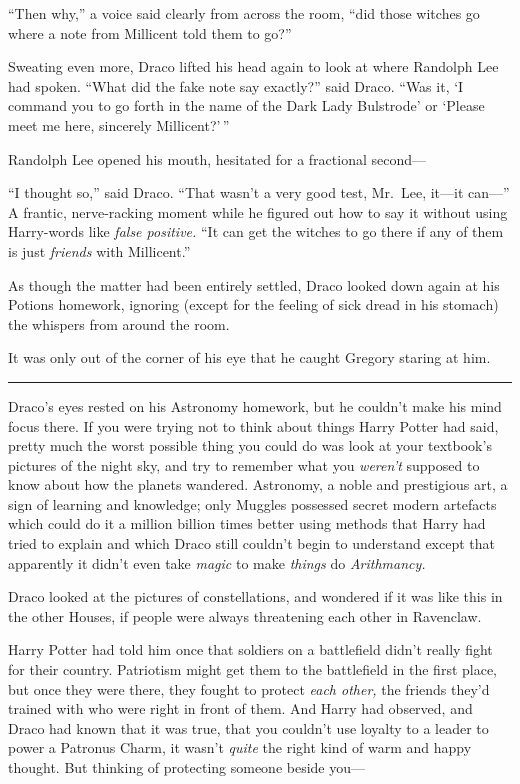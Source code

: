 ``Then why,'' a voice said clearly from across the room, ``did those
witches go where a note from Millicent told them to go?''

Sweating even more, Draco lifted his head again to look at where
Randolph Lee had spoken. ``What did the fake note say exactly?'' said
Draco. ``Was it, `I command you to go forth in the name of the Dark Lady
Bulstrode' or `Please meet me here, sincerely Millicent?'\,''

Randolph Lee opened his mouth, hesitated for a fractional second---

``I thought so,'' said Draco. ``That wasn't a very good test, Mr.~Lee,
it---it can---'' A frantic, nerve-racking moment while he figured out
how to say it without using Harry-words like \emph{false positive.} ``It
can get the witches to go there if any of them is just \emph{friends}
with Millicent.''

As though the matter had been entirely settled, Draco looked down again
at his Potions homework, ignoring (except for the feeling of sick dread
in his stomach) the whispers from around the room.

It was only out of the corner of his eye that he caught Gregory staring
at him.

\begin{center}\rule{3in}{0.4pt}\end{center}

Draco's eyes rested on his Astronomy homework, but he couldn't make his
mind focus there. If you were trying not to think about things Harry
Potter had said, pretty much the worst possible thing you could do was
look at your textbook's pictures of the night sky, and try to remember
what you \emph{weren't} supposed to know about how the planets wandered.
Astronomy, a noble and prestigious art, a sign of learning and
knowledge; only Muggles possessed secret modern artefacts which could do
it a million billion times better using methods that Harry had tried to
explain and which Draco still couldn't begin to understand except that
apparently it didn't even take \emph{magic} to make \emph{things} do
\emph{Arithmancy.}

Draco looked at the pictures of constellations, and wondered if it was
like this in the other Houses, if people were always threatening each
other in Ravenclaw.

Harry Potter had told him once that soldiers on a battlefield didn't
really fight for their country. Patriotism might get them to the
battlefield in the first place, but once they were there, they fought to
protect \emph{each other,} the friends they'd trained with who were
right in front of them. And Harry had observed, and Draco had known that
it was true, that you couldn't use loyalty to a leader to power a
Patronus Charm, it wasn't \emph{quite} the right kind of warm and happy
thought. But thinking of protecting someone beside you---

